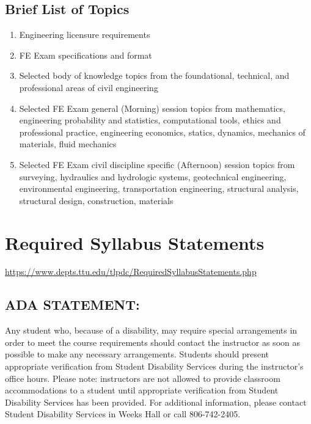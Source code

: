 \documentclass[12pt]{article}
\begin{document}
\subsection*{{Brief List of Topics}}
\begin{enumerate}
\item Engineering licensure requirements
\item FE Exam specifications and format
\item Selected body of knowledge topics from the foundational, technical, and
professional areas of civil engineering
\item Selected FE Exam general (Morning) session topics from mathematics, engineering
probability and statistics, computational tools, ethics and professional practice,
engineering economics, statics, dynamics, mechanics of materials, fluid mechanics
\item Selected FE Exam civil discipline specific (Afternoon) session topics from
surveying, hydraulics and hydrologic systems, geotechnical engineering,
environmental engineering, transportation engineering, structural analysis,
structural design, construction, materials
\end{enumerate}

\section*{Required Syllabus Statements}
\url{https://www.depts.ttu.edu/tlpdc/RequiredSyllabusStatements.php}
\subsection*{ADA STATEMENT:}
Any student who, because of a disability, may require special arrangements in order to meet the course requirements should contact the instructor as soon as possible to make any necessary arrangements. Students should present appropriate verification from Student Disability Services during the instructor's office hours. Please note: instructors are not allowed to provide classroom accommodations to a student until appropriate verification from Student Disability Services has been provided. For additional information, please contact Student Disability Services in Weeks Hall or call 806-742-2405.
\end{document}
